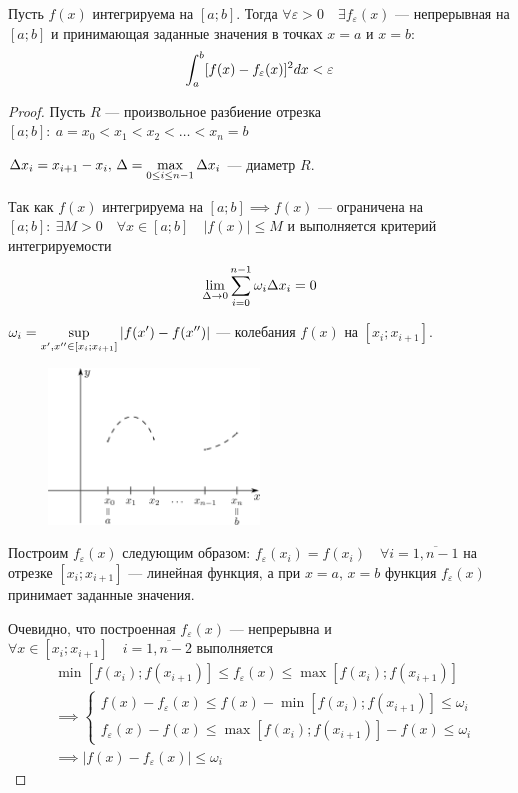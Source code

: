 \begin{theorem}
    Пусть $f(x)$ интегрируема на $[a; b]$. Тогда $\forall \varepsilon > 0 \quad
    \exists f_\varepsilon(x)$ --- непрерывная на $[a; b]$ и принимающая 
    заданные значения в точках $x = a$ и $x = b$:
    \[ \displaystyle\int_a^b [f(x) - f_\varepsilon(x)]^2 dx < \varepsilon \]
\end{theorem}
\begin{proof}
    Пусть $R$ --- произвольное разбиение отрезка $[a; b]: \:
    a = x_0 < x_1 < x_2 < \dots < x_n = b$

    $\Delta x_i = x_{i + 1} - x_i, \, \Delta = \displaystyle\max_{0 \leq i \leq n - 1}
    \Delta x_i$ --- диаметр $R$.

    Так как $f(x)$ интегрируема на $[a; b] \implies f(x)$ --- ограничена на
    $[a; b]: \: \exists M > 0 \quad \forall x \in [a; b] \quad |f(x)| \leq M$
    и выполняется критерий интегрируемости 
    \[ \displaystyle\lim_{\Delta \to 0} \displaystyle\sum_{i = 0}^{n - 1} \omega_i \Delta x_i = 0 \]

    $\omega_i = \displaystyle\sup_{x', x'' \in [x_i; x_{i + 1}]} |f(x') - f(x'')|$ ---
    колебания $f(x)$ на $[x_i; x_{i + 1}]$.

    \begin{figure}[H]
        \centering
        \includegraphics[width=0.5\textwidth]{images/approx_mean.png}
    \end{figure}

    Построим $f_\varepsilon(x)$ следующим образом: $f_\varepsilon(x_i) = f(x_i)
    \quad \forall i = \overline{1, n - 1}$ на отрезке $[x_i; x_{i + 1}]$ ---
    линейная функция, а при $x = a, \, x = b$ функция $f_\varepsilon(x)$
    принимает заданные значения.

    Очевидно, что построенная $f_\varepsilon(x)$ --- непрерывна и
    $\forall x \in [x_i; x_{i + 1}] \quad i = \overline{1, n - 2}$ выполняется
    \begin{align*}
        &\min [f(x_i); f(x_{i + 1})] \leq 
        f_\varepsilon(x) \leq \max [f(x_i); f(x_{i + 1})] \\
        &\implies \begin{cases}
            f(x) - f_\varepsilon(x) \leq f(x) - \min [f(x_i); f(x_{i + 1})] \leq \omega_i \\
            f_\varepsilon(x) - f(x) \leq \max [f(x_i); f(x_{i + 1})] - f(x) \leq \omega_i
        \end{cases} \\
        &\implies |f(x) - f_\varepsilon(x)| \leq \omega_i
    \end{align*} 


\end{proof}
